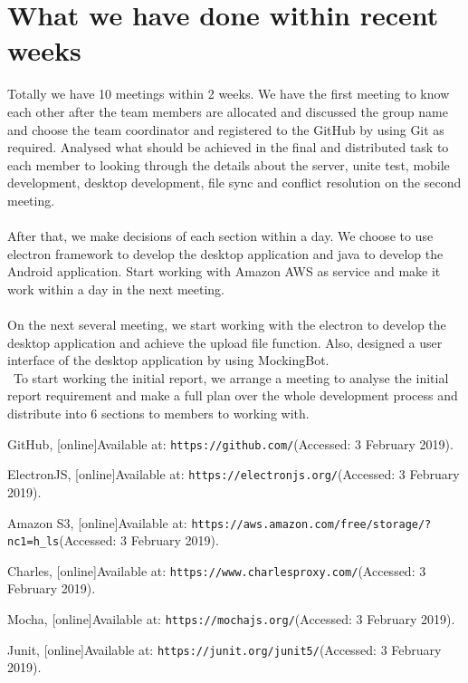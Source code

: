 \documentclass[a4paper]{article}
\begin{document}
{\section{What we have done within recent weeks}
Totally we have 10 meetings within 2 weeks. We have the first meeting to know each other after the team members are allocated and discussed the group name and choose the team coordinator and registered to the GitHub by using Git as required. Analysed what should be achieved in the final and distributed task to each member to looking through the details about the server, unite test, mobile development, desktop development, file sync and conflict resolution on the second meeting. \\\\
After that, we make decisions of each section within a day. We choose to use electron framework to develop the desktop application and java to develop the Android application. Start working with Amazon AWS as service and make it work within a day in the next meeting. \\\\
On the next several meeting, we start working with the electron to develop the desktop application and achieve the upload file function. Also, designed a user interface of the desktop application by using MockingBot. \\\
To start working the initial report, we arrange a meeting to analyse the initial report requirement and make a full plan over the whole development process and distribute into 6 sections to members to working with.

\medskip

\begin{thebibliography}{9}
GitHub, [online]Available at:
\texttt{https://github.com/}(Accessed: 3 February 2019).

ElectronJS, [online]Available at:
\texttt{https://electronjs.org/}(Accessed: 3 February 2019).

Amazon S3, [online]Available at:
\texttt{https://aws.amazon.com/free/storage/?nc1=h\_ls}(Accessed: 3 February 2019).

Charles, [online]Available at:
\texttt{https://www.charlesproxy.com/}(Accessed: 3 February 2019).

Mocha, [online]Available at:
\texttt{https://mochajs.org/}(Accessed: 3 February 2019).

Junit, [online]Available at:
\texttt{https://junit.org/junit5/}(Accessed: 3 February 2019).



\end{thebibliography}}
\end{document}
